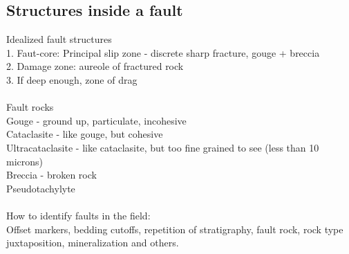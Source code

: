 \documentclass[12pt,a4paper]{report}
\begin{document}
\subsection*{Structures inside a fault}
Idealized fault structures\\
1. Faut-core: Principal slip zone - discrete sharp fracture, gouge + breccia\\
2. Damage zone: aureole of fractured rock\\
3. If deep enough, zone of drag\\
\\
Fault rocks\\
Gouge - ground up, particulate, incohesive\\
Cataclasite - like gouge, but cohesive\\
Ultracataclasite - like cataclasite, but too fine grained to see (less than 10 microns)\\
Breccia - broken rock\\
Pseudotachylyte\\
\\
How to identify faults in the field:\\
Offset markers, bedding cutoffs, repetition of stratigraphy, fault rock, rock type juxtaposition, mineralization and others.
\end{document}
